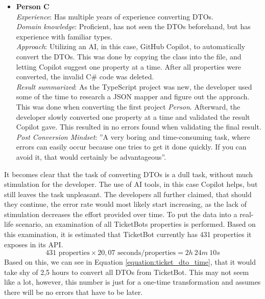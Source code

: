 \begin{itemize}
    \item \textbf{Person C} \\ %
    \textit{Experience}: Has multiple years of experience converting DTOs. \\
    \textit{Domain knowledge}: Proficient, has not seen the DTOs beforehand, but has experience with familiar types. \\
    \textit{Approach}: Utilizing an AI, in this case, GitHub Copilot, to automatically convert the DTOs. This was done by copying the class into the file, and letting Copilot suggest one property at a time. After all properties were converted, the invalid C\# code was deleted.\\
    \textit{Result summarized}: As the TypeScript project was new, the developer used some of the time to research a JSON mapper and figure out the approach. This was done when converting the first project \textit{Person}. Afterward, the developer slowly converted one property at a time and validated the result Copilot gave. This resulted in no errors found when validating the final result. \\
    \textit{Post Conversion Mindset}: ''A very boring and time-consuming task, where errors can easily occur because one tries to get it done quickly. If you can avoid it, that would certainly be advantageous''.

\end{itemize}
\noindent
It becomes clear that the task of converting DTOs is a dull task, without much stimulation for the developer. 
The use of AI tools, in this case Copilot helps, but still leaves the task unpleasant. The developers all further claimed, that should they continue, the error rate would most likely start increasing, as the lack of stimulation decreases the effort provided over time. 
\newline\newline
To put the data into a real-life scenario, an examination of all TicketBots properties is performed. Based on this examination, it is estimated that TicketBot currently has 431 properties it exposes in its API.
\begin{equation}
\label{equation:ticket_dto_time}
    431 \text{ properties} \times 20,07 \text{ seconds/properties} = 2h\ 24m\ 10s
\end{equation}
Based on this, we can see in Equation \ref{equation:ticket_dto_time}, that it would take shy of 2,5 hours to convert all DTOs from TicketBot.
This may not seem like a lot, however, this number is just for a one-time transformation and assumes there will be no errors that have to be later.

